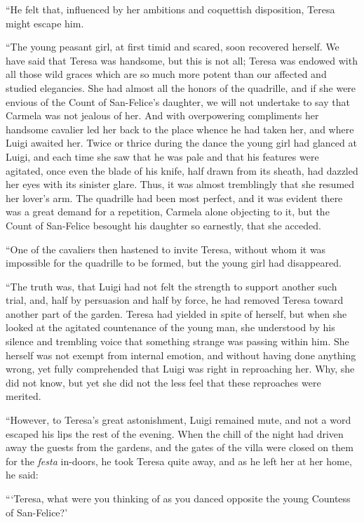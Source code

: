 “He felt that, influenced by her ambitions and coquettish disposition,
Teresa might escape him.

“The young peasant girl, at first timid and scared, soon recovered
herself. We have said that Teresa was handsome, but this is not all;
Teresa was endowed with all those wild graces which are so much more
potent than our affected and studied elegancies. She had almost all the
honors of the quadrille, and if she were envious of the Count of
San-Felice’s daughter, we will not undertake to say that Carmela was
not jealous of her. And with overpowering compliments her handsome
cavalier led her back to the place whence he had taken her, and where
Luigi awaited her. Twice or thrice during the dance the young girl had
glanced at Luigi, and each time she saw that he was pale and that his
features were agitated, once even the blade of his knife, half drawn
from its sheath, had dazzled her eyes with its sinister glare. Thus, it
was almost tremblingly that she resumed her lover’s arm. The quadrille
had been most perfect, and it was evident there was a great demand for
a repetition, Carmela alone objecting to it, but the Count of
San-Felice besought his daughter so earnestly, that she acceded.

“One of the cavaliers then hastened to invite Teresa, without whom it
was impossible for the quadrille to be formed, but the young girl had
disappeared.

“The truth was, that Luigi had not felt the strength to support another
such trial, and, half by persuasion and half by force, he had removed
Teresa toward another part of the garden. Teresa had yielded in spite
of herself, but when she looked at the agitated countenance of the
young man, she understood by his silence and trembling voice that
something strange was passing within him. She herself was not exempt
from internal emotion, and without having done anything wrong, yet
fully comprehended that Luigi was right in reproaching her. Why, she
did not know, but yet she did not the less feel that these reproaches
were merited.

“However, to Teresa’s great astonishment, Luigi remained mute, and not
a word escaped his lips the rest of the evening. When the chill of the
night had driven away the guests from the gardens, and the gates of the
villa were closed on them for the \textit{festa} in-doors, he took Teresa
quite away, and as he left her at her home, he said:

“‘Teresa, what were you thinking of as you danced opposite the young
Countess of San-Felice?’

